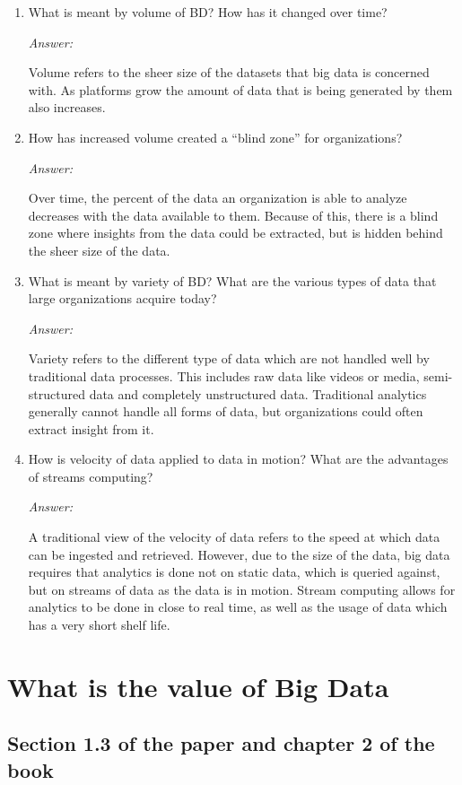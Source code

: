 \documentclass[11pt]{article}
\newcommand{\answer}{\vspace{0.25em}\par\textit{Answer:}\vspace{0.25em}\par}
\begin{document}
\begin{enumerate}
  \item What is meant by volume of BD? How has it changed over time?
    \answer Volume refers to the sheer size of the datasets that big
    data is concerned with. As platforms grow the amount of data that
    is being generated by them also increases.
  \item How has increased volume created a ``blind zone'' for organizations?
    \answer Over time, the percent
    of the data an organization is able to analyze decreases with the
    data available to them. Because of this, there is a blind zone
    where insights from the data could be extracted, but is hidden
    behind the sheer size of the data.
  \item What is meant by variety of BD? What are the various types of
    data that large
    organizations acquire today?
    \answer Variety refers to the different type of data which are not
    handled well by traditional data processes. This includes raw
    data like videos or media, semi-structured data and completely
    unstructured data. Traditional analytics generally cannot handle
    all forms of data, but organizations could often extract insight from it.
  \item How is velocity of data applied to data in motion? What are
    the advantages of streams
    computing?
    \answer A traditional view of the velocity of data refers to the
    speed at which data can be ingested and retrieved. However, due
    to the size of the data, big data requires that analytics is done
    not on static data, which is queried against, but on streams of
    data as the data is in motion. Stream computing allows for
    analytics to be done in close to real time, as well as the usage
    of data which has a very short shelf life.
\end{enumerate}

\section{What is the value of Big Data}

\subsection*{Section 1.3 of the paper and chapter 2 of the book}
\end{document}
